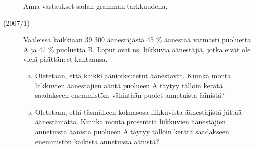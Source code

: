 \begin{description}
    	Anna vastaukset sadan gramman tarkkuudella.

	\item[(2007/1)] Vaaleissa kaikkiaan 39 300 äänestäjästä 45 \% äänestää varmasti
        puoluetta A ja 47 \% puoluetta B. Loput ovat ns. liikkuvia äänestäjiä,
        jotka eivät ole vielä päättäneet kantaansa.
	
    	\begin{enumerate}[(a)]
    		\item Oletetaan, että kaikki äänioikeutetut äänestävät. Kuinka monta
                liikkuvien äänestäjien ääntä puolueen A täytyy tällöin kerätä
                saadakseen enemmistön, vähintään puolet annetuista äänistä?
    		\item Oletetaan, että täsmälleen kolmasosa liikkuvista äänestäjistä
                jättää äänestämättä. Kuinka monta prosenttia liikkuvien äänestäjien
                annetuista äänistä puolueen A täytyy tällöin kerätä saadakseen 
    		    enemmistön kaikista annetuista äänistä?
    	\end{enumerate}	 	
	
\end{description}
